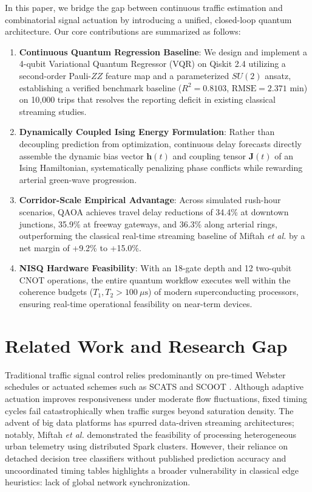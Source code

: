 \documentclass{llncs}
\begin{document}
In this paper, we bridge the gap between continuous traffic estimation and combinatorial signal actuation by introducing a unified, closed-loop quantum architecture. Our core contributions are summarized as follows:
\begin{enumerate}
    \item \textbf{Continuous Quantum Regression Baseline}: We design and implement a 4-qubit Variational Quantum Regressor (VQR) on Qiskit 2.4 utilizing a second-order Pauli-$ZZ$ feature map and a parameterized $SU(2)$ ansatz, establishing a verified benchmark baseline ($R^2 = 0.8103$, $\text{RMSE} = 2.371\text{ min}$) on 10,000 trips that resolves the reporting deficit in existing classical streaming studies.
    \item \textbf{Dynamically Coupled Ising Energy Formulation}: Rather than decoupling prediction from optimization, continuous delay forecasts directly assemble the dynamic bias vector $\mathbf{h}(t)$ and coupling tensor $\mathbf{J}(t)$ of an Ising Hamiltonian, systematically penalizing phase conflicts while rewarding arterial green-wave progression.
    \item \textbf{Corridor-Scale Empirical Advantage}: Across simulated rush-hour scenarios, QAOA achieves travel delay reductions of 34.4\% at downtown junctions, 35.9\% at freeway gateways, and 36.3\% along arterial rings, outperforming the classical real-time streaming baseline of Miftah \textit{et al.} \cite{miftah2025big} by a net margin of +9.2\% to +15.0\%.
    \item \textbf{NISQ Hardware Feasibility}: With an 18-gate depth and 12 two-qubit CNOT operations, the entire quantum workflow executes well within the coherence budgets ($T_1, T_2 > 100\ \mu\text{s}$) of modern superconducting processors, ensuring real-time operational feasibility on near-term devices.
\end{enumerate}

\section{Related Work and Research Gap}

Traditional traffic signal control relies predominantly on pre-timed Webster schedules or actuated schemes such as SCATS and SCOOT \cite{greenshields1935study,daganzo1997fundamentals}. Although adaptive actuation improves responsiveness under moderate flow fluctuations, fixed timing cycles fail catastrophically when traffic surges beyond saturation density. The advent of big data platforms has spurred data-driven streaming architectures; notably, Miftah \textit{et al.} \cite{miftah2025big} demonstrated the feasibility of processing heterogeneous urban telemetry using distributed Spark clusters. However, their reliance on detached decision tree classifiers without published prediction accuracy and uncoordinated timing tables highlights a broader vulnerability in classical edge heuristics: lack of global network synchronization.
\end{document}
